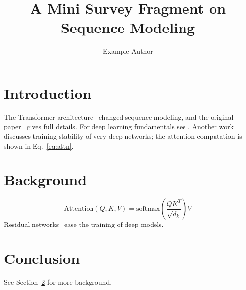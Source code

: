 \documentclass{article}
\title{A Mini Survey Fragment on Sequence Modeling}
\author{Example Author}
\date{}
\begin{document}
\maketitle

\section{Introduction}\label{sec:intro}
The Transformer architecture~\cite{vaswani2017attentoin} changed sequence
modeling, and the original paper~\cite{vaswani2017attention} gives full
details. For deep learning fundamentals see
\cite{goodfellow2016deep,lecun2015deep}. Another work~\cite{zhang2020residual}
discusses training stability of very deep networks; the attention computation
is shown in Eq.~\eqref{eq:attn}.

\section{Background}\label{sec:intro}
\begin{equation}\label{eq:attn}
  \mathrm{Attention}(Q,K,V) =
  \mathrm{softmax}\!\left(\frac{QK^{T}}{\sqrt{d_k}}\right)V
\end{equation}
Residual networks~\cite{he2016deep} ease the training of deep models.

\section{Conclusion}
See Section~\ref{sec:intro} for more background.



\end{document}
